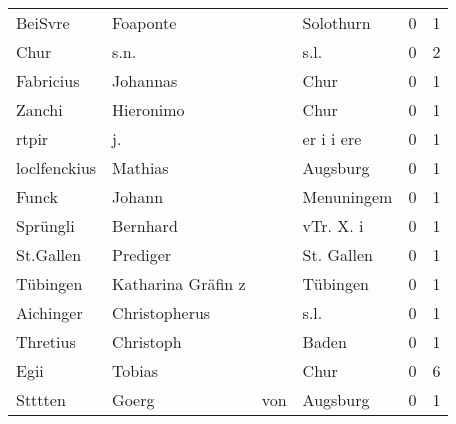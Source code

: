 \begin{center}
\begin{tiny}
\begin{longtabu}{llllrr}
                  BeiSvre &                           Foaponte &             &                                   Solothurn &          0 &         1 \\
                     Chur &                               s.n. &             &                                        s.l. &          0 &         2 \\
                Fabricius &                           Johannas &             &                                        Chur &          0 &         1 \\
                   Zanchi &                          Hieronimo &             &                                        Chur &          0 &         1 \\
                    rtpir &                                 j. &             &                                  er i i ere &          0 &         1 \\
             loclfenckius &                            Mathias &             &                                    Augsburg &          0 &         1 \\
                    Funck &                             Johann &             &                                  Menuningem &          0 &         1 \\
                 Sprüngli &                           Bernhard &             &                                   vTr. X. i &          0 &         1 \\
                St.Gallen &                           Prediger &             &                                  St. Gallen &          0 &         1 \\
                 Tübingen &                 Katharina Gräfin z &             &                                    Tübingen &          0 &         1 \\
                Aichinger &                      Christopherus &             &                                        s.l. &          0 &         1 \\
                 Thretius &                          Christoph &             &                                       Baden &          0 &         1 \\
                     Egii &                             Tobias &             &                                        Chur &          0 &         6 \\
                  Stttten &                              Goerg &         von &                                    Augsburg &          0 &         1 \\

\end{longtabu}
\end{tiny}
\end{center}
